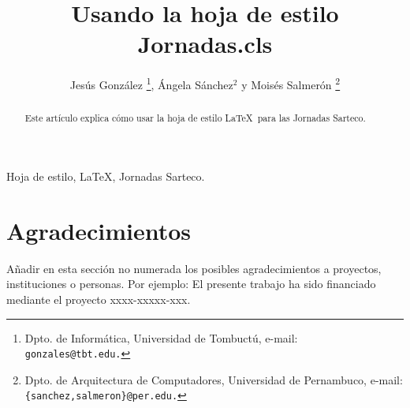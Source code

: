 \documentclass[twocolumn,twoside]{Jornadas}
\begin{document}
\title{Usando la hoja de estilo Jornadas.cls}

\author{%
     Jesús González%
     \thanks{Dpto. de Informática, Universidad de Tombuctú, e-mail: {\tt gonzales@tbt.edu.}},
     Ángela Sánchez$^2$ y Moisés Salmerón%
     \thanks{Dpto. de Arquitectura de Computadores, Universidad de Pernambuco, 
     e-mail: {\tt \{sanchez,salmeron\}@per.edu.}}
}

\maketitle
\markboth{}{}
\pagestyle{empty} 
\thispagestyle{empty} %

\begin{abstract}
Este artículo explica cómo usar la hoja de estilo \LaTeX\ para las
Jornadas Sarteco.
\end{abstract}

\begin{keywords}
Hoja de estilo, \LaTeX, Jornadas Sarteco.
\end{keywords}









\section*{Agradecimientos}

Añadir en esta sección no numerada los posibles agradecimientos a proyectos,
instituciones o personas. Por ejemplo: El presente trabajo ha sido financiado
mediante  el proyecto xxxx-xxxxx-xxx. 

\nocite{*}


\end{document}
